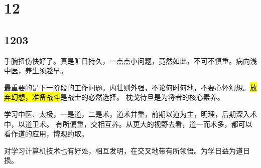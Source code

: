 \section{12}

\subsection{1203}

手腕扭伤快好了。真是旷日持久，一点点小问题，竟然如此，不可不慎重。病向浅中医，养生须趁早。

最重要的是下一阶段的工作问题。内壮则外强，不论何时何地，不要心怀幻想。\hl{放弃幻想，准备战斗}是战士的必然选择。
枕戈待旦是为将者的核心素养。

学习中医、太极，一是道，二是术，道术并重，前期以道为主，明理，后期深入术中，以道卫术。
有所偏重，交相互养。从更大的视野去看，道一而术多，都可以看作道的应用，博观约取。

对学习计算机技术也有好处，相互发明，在交叉地带有所领悟。为学日益为道日损。

